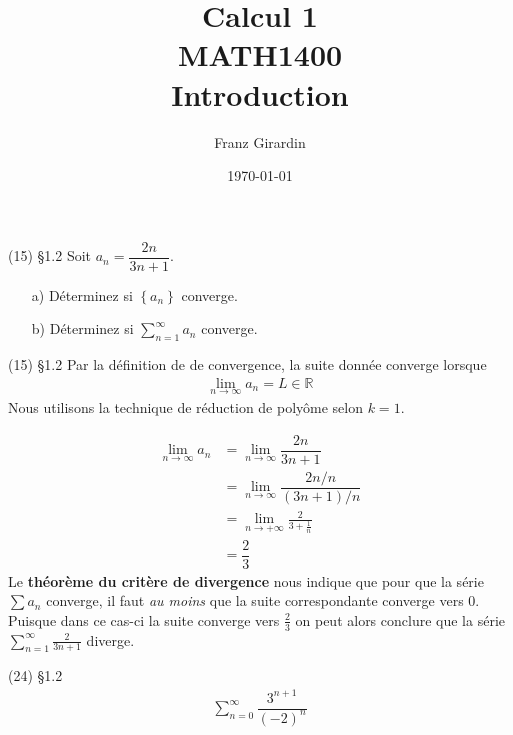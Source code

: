 \documentclass{report}
\title{\Huge{Calcul 1}\\{MATH1400}\\{\textbf{Introduction}}}
\author{\huge{Franz Girardin}}
\date{\today}
\begin{document}
\maketitle
\pagebreak
\begin{multicols*}{3}


    \footnotesize
    \begin{Exercice}{(15) \S 1.2}
        Soit $a_n=\dfrac{2 n}{3 n+1}$.
        \begin{itemize}
            \item[a)] Déterminez si $\left\{ a_n \right\}$ converge.
            \item[b)] Déterminez si $\sum_{n=1}^{\infty } a_n$ converge. 
        \end{itemize}
    \end{Exercice}

    \begin{Reponse}{ (15) \S 1.2}
        Par la définition de de convergence, la suite donnée 
        converge lorsque 
        \begin{align*}
            \lim\limits_{n\to\infty  }a_n = L \in \mathbb{R} 
        \end{align*}
        Nous utilisons la technique de réduction de polyôme 
        selon $k = 1$. 

        \begin{align*}
            \lim\limits_{n\to\infty  }a_n &= 
             \lim\limits_{n\to\infty  }\dfrac{2n}{3n+1} \\ 
                                &= 
            \lim\limits_{n\to\infty  }\dfrac{2n/n}{(3n+1)/n} \\ 
                                &= 
            \lim\limits_{n\to+\infty }\frac{2}{3 + \frac{1}{n} }  \\ 
                                &=
            \dfrac{2}{3} 
        \end{align*}
        Le \textbf{théorème du critère de divergence} nous indique 
        que pour que la série $\sum a_n$ converge, il faut 
        \textit{au moins} que la suite correspondante converge vers 0. 
        Puisque dans ce cas-ci la suite converge vers $ \frac{2}{3} $
        on peut alors conclure que la série 
        $\sum_{n=1}^{\infty }\frac{2}{3n+1}$ diverge. 
        \end{Reponse}

        \begin{Exercice}{(24) \S 1.2}{}
            \begin{align*}
                \sum_{n=0}^{\infty }\dfrac{3^{n+1}}{(-2)^n} 
            \end{align*}
        \end{Exercice}


\end{multicols*}
\end{document}
